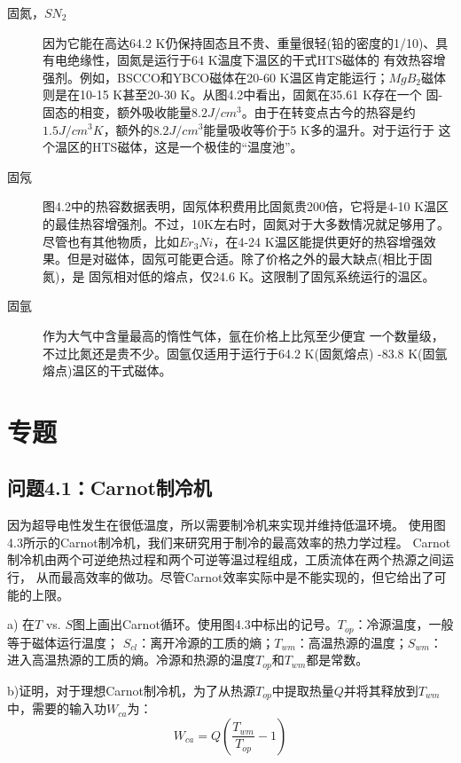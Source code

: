 \begin{description}
  \item[固氮，$SN_2$] 因为它能在高达64.2 K仍保持固态且不贵、重量很轻(铅的密度的1/10)、具有电绝缘性，固氮是运行于64 K温度下温区的干式HTS磁体的
  有效热容增强剂。例如，BSCCO和YBCO磁体在20-60 K温区肯定能运行；$MgB_2$磁体则是在10-15 K甚至20-30 K。从图4.2中看出，固氮在35.61 K存在一个
  固-固态的相变，额外吸收能量$8.2J/cm^3$。由于在转变点古今的热容是约$1.5J/cm^3 K$，额外的$8.2J/cm^3$能量吸收等价于5 K多的温升。对于运行于
  这个温区的HTS磁体，这是一个极佳的“温度池”。
  \item[固氖] 图4.2中的热容数据表明，固氖体积费用比固氮贵200倍，它将是4-10 K温区的最佳热容增强剂。不过，10K左右时，固氮对于大多数情况就足够用了。
  尽管也有其他物质，比如$Er_3 Ni$，在4-24 K温区能提供更好的热容增强效果。但是对磁体，固氖可能更合适。除了价格之外的最大缺点(相比于固氮)，是
  固氖相对低的熔点，仅24.6 K。这限制了固氖系统运行的温区。
  \item[固氩] 作为大气中含量最高的惰性气体，氩在价格上比氖至少便宜 一个数量级，不过比氮还是贵不少。固氩仅适用于运行于64.2 K(固氮熔点)
  -83.8 K(固氩熔点)温区的干式磁体。
\end{description}

\section{专题}
\subsection{问题4.1：Carnot制冷机}
因为超导电性发生在很低温度，所以需要制冷机来实现并维持低温环境。
使用图4.3所示的Carnot制冷机，我们来研究用于制冷的最高效率的热力学过程。
Carnot制冷机由两个可逆绝热过程和两个可逆等温过程组成，工质流体在两个热源之间运行，
从而最高效率的做功。尽管Carnot效率实际中是不能实现的，但它给出了可能的上限。

a) 在$T$ vs. $S$图上画出Carnot循环。使用图4.3中标出的记号。$T_{op}$：冷源温度，一般等于磁体运行温度；
$S_{cl}$：离开冷源的工质的熵；$T_{wm}$：高温热源的温度；$S_{wm}$：进入高温热源的工质的熵。冷源和热源的温度$T_{op}$和$T_{wm}$都是常数。

b)证明，对于理想Carnot制冷机，为了从热源$T_{op}$中提取热量$Q$并将其释放到$T_{wm}$中，需要的输入功$W_{ca}$为：
\begin{equation}%
W_{ca}=Q(\frac{T_{wm}}{T_{op}}-1)
\end{equation}

